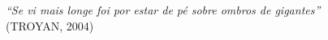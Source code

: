 \thispagestyle{empty}

\vspace*{\fill} %

\begin{flushright}
    \begin{minipage}{0.6\textwidth}
        \textit{\enquote{Se vi mais longe foi por estar de pé sobre ombros de gigantes}} \\
        (TROYAN, 2004)
    \end{minipage}
\end{flushright}

\vspace{2cm}
